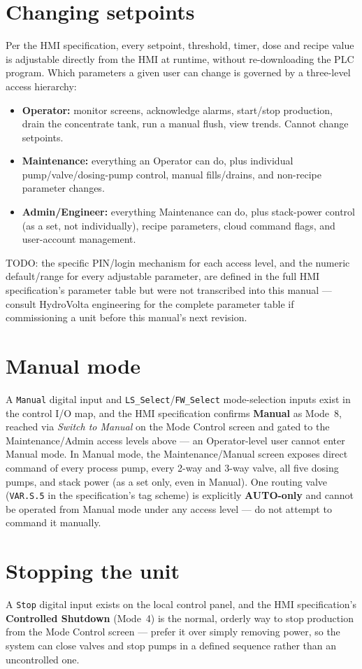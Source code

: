 \documentclass[a4paper,11pt,twoside,openright,numbers=noenddot]{scrreprt}
\newcommand{\plctag}[1]{\texttt{\small #1}}
\begin{document}
\section{Changing setpoints}
Per the HMI specification, every setpoint, threshold, timer, dose and
recipe value is adjustable directly from the HMI at runtime, without
re-downloading the PLC program. Which parameters a given user can change
is governed by a three-level access hierarchy:
\begin{itemize}
\item \textbf{Operator:} monitor screens, acknowledge alarms, start/stop
  production, drain the concentrate tank, run a manual flush, view
  trends. Cannot change setpoints.
\item \textbf{Maintenance:} everything an Operator can do, plus
  individual pump/valve/dosing-pump control, manual fills/drains, and
  non-recipe parameter changes.
\item \textbf{Admin/Engineer:} everything Maintenance can do, plus
  stack-power control (as a set, not individually), recipe parameters,
  cloud command flags, and user-account management.
\end{itemize}
TODO: the specific PIN/login mechanism for each access level, and the
numeric default/range for every adjustable parameter, are defined in the
full HMI specification's parameter table but were not transcribed into
this manual --- consult HydroVolta engineering for the complete parameter
table if commissioning a unit before this manual's next revision.

\section{Manual mode}
A \plctag{Manual} digital input and \plctag{LS\_Select}/\plctag{FW\_Select}
mode-selection inputs exist in the control I/O map, and the HMI
specification confirms \textbf{Manual} as Mode~8, reached via \emph{Switch
to Manual} on the Mode Control screen and gated to the Maintenance/Admin
access levels above --- an Operator-level user cannot enter Manual mode.
In Manual mode, the Maintenance/Manual screen exposes direct command of
every process pump, every 2-way and 3-way valve, all five dosing pumps,
and stack power (as a set only, even in Manual). One routing valve
(\plctag{VAR.S.5} in the specification's tag scheme) is explicitly
\textbf{AUTO-only} and cannot be operated from Manual mode under any
access level --- do not attempt to command it manually.

\section{Stopping the unit}
A \plctag{Stop} digital input exists on the local control panel, and the
HMI specification's \textbf{Controlled Shutdown} (Mode~4) is the normal,
orderly way to stop production from the Mode Control screen --- prefer it
over simply removing power, so the system can close valves and stop pumps
in a defined sequence rather than an uncontrolled one.
\end{document}
